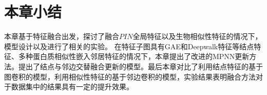 \section{本章小结}
\label{section:MPNN:summary}

本章基于特征融合出发，探讨了融合$PIN$全局特征以及生物相似性特征的情况下，模型设计以及进行了相关的实验。
在特征子图具有GAE和Deepwalk特征等结点特征、多种蛋白质相似性嵌入邻居特征的情况下，本章提出了改进的MPNN更新方法。提出了结点与邻边交替融合更新的模型。最后本章对比了利用结点特征的基于图卷积的模型，利用相似性特征的基于邻边卷积的模型，实验结果表明融合方法对于数据集中的结果具有一定的提升效果。